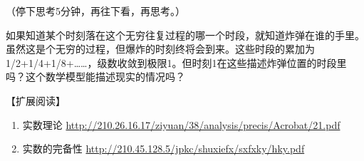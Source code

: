 （停下思考5分钟，再往下看，再思考。）

如果知道某个时刻落在这个无穷往复过程的哪一个时段，就知道炸弹在谁的手里。虽然这是个无穷的过程，但爆炸的时刻终将会到来。这些时段的累加为1/2+1/4+1/8+……，级数收敛到极限1。但时刻1在这些描述炸弹位置的时段里吗？这个数学模型能描述现实的情况吗？

\songti
\setlength{\leftskip}{0em}

【扩展阅读】

\begin{enumerate}
	\item 实数理论 \url{http://210.26.16.17/ziyuan/38/analysis/precis/Acrobat/21.pdf}

	\item 实数的完备性 \url{http://210.45.128.5/jpkc/shuxiefx/sxfxky/hky.pdf}
\end{enumerate}
